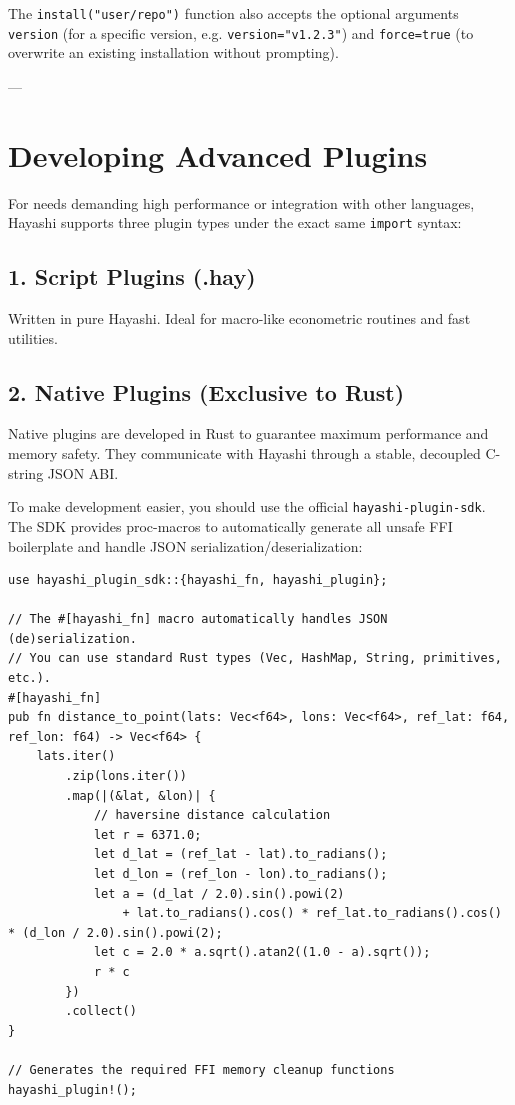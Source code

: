 The \lstinline{install("user/repo")} function also accepts the optional arguments \lstinline{version} (for a specific version, e.g. \lstinline{version="v1.2.3"}) and \lstinline{force=true} (to overwrite an existing installation without prompting).

---

\section{Developing Advanced Plugins}

For needs demanding high performance or integration with other languages, Hayashi supports three plugin types under the exact same \lstinline{import} syntax:

\subsection{1. Script Plugins (.hay)}
Written in pure Hayashi. Ideal for macro-like econometric routines and fast utilities.

\subsection{2. Native Plugins (Exclusive to Rust)}
Native plugins are developed in Rust to guarantee maximum performance and memory safety. They communicate with Hayashi through a stable, decoupled C-string JSON ABI.

To make development easier, you should use the official \texttt{hayashi-plugin-sdk}. The SDK provides proc-macros to automatically generate all unsafe FFI boilerplate and handle JSON serialization/deserialization:

\begin{lstlisting}[caption={Developing a native plugin using the SDK}]
use hayashi_plugin_sdk::{hayashi_fn, hayashi_plugin};

// The #[hayashi_fn] macro automatically handles JSON (de)serialization.
// You can use standard Rust types (Vec, HashMap, String, primitives, etc.).
#[hayashi_fn]
pub fn distance_to_point(lats: Vec<f64>, lons: Vec<f64>, ref_lat: f64, ref_lon: f64) -> Vec<f64> {
    lats.iter()
        .zip(lons.iter())
        .map(|(&lat, &lon)| {
            // haversine distance calculation
            let r = 6371.0;
            let d_lat = (ref_lat - lat).to_radians();
            let d_lon = (ref_lon - lon).to_radians();
            let a = (d_lat / 2.0).sin().powi(2)
                + lat.to_radians().cos() * ref_lat.to_radians().cos() * (d_lon / 2.0).sin().powi(2);
            let c = 2.0 * a.sqrt().atan2((1.0 - a).sqrt());
            r * c
        })
        .collect()
}

// Generates the required FFI memory cleanup functions
hayashi_plugin!();
\end{lstlisting}

